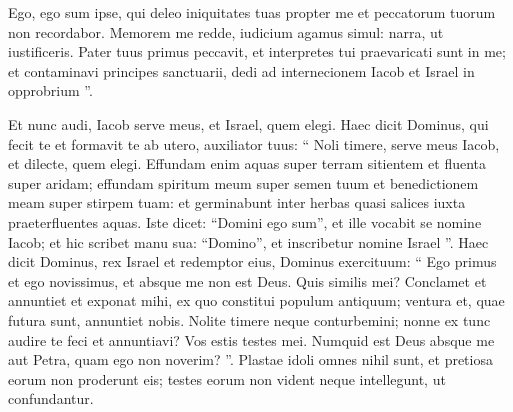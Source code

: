 \begin{biblechapter}
\begin{biblechapter}
\begin{biblechapter}
\begin{biblechapter}
\begin{biblechapter}
\begin{biblechapter}
\begin{biblechapter}
\begin{biblechapter}
\begin{biblechapter}
\begin{biblechapter}
\begin{biblechapter}
\begin{biblechapter}
\begin{biblechapter}
\begin{biblechapter}
\begin{biblechapter}
\begin{biblechapter}
\begin{biblechapter}
\begin{biblechapter}
\begin{biblechapter}
\begin{biblechapter}
\begin{biblechapter}
\begin{biblechapter}
\begin{biblechapter}
\begin{biblechapter}
\begin{biblechapter}
\begin{biblechapter}
\begin{biblechapter}
\begin{biblechapter}
\begin{biblechapter}
\begin{biblechapter}
\begin{biblechapter}
\begin{biblechapter}
\begin{biblechapter}
\begin{biblechapter}
\begin{biblechapter}
\begin{biblechapter}
\begin{biblechapter}
\begin{biblechapter}
\begin{biblechapter}
\begin{biblechapter}
\begin{biblechapter}
\begin{biblechapter}
\begin{biblechapter}
 \verse Ego, ego sum ipse, qui deleo iniquitates tuas propter me
 et peccatorum tuorum non recordabor.
 \verse Memorem me redde, iudicium agamus simul:
 narra, ut iustificeris.
 \verse Pater tuus primus peccavit,
 et interpretes tui praevaricati sunt in me;
 \verse et contaminavi principes sanctuarii,
 dedi ad internecionem Iacob
 et Israel in opprobrium ”.
 
\begin{biblechapter}
\verse Et nunc audi, Iacob serve meus,
 et Israel, quem elegi.
 \verse Haec dicit Dominus, qui fecit te
 et formavit te ab utero,
 auxiliator tuus:
 “ Noli timere, serve meus Iacob,
 et dilecte, quem elegi.
 \verse Effundam enim aquas super terram sitientem
 et fluenta super aridam;
 effundam spiritum meum super semen tuum
 et benedictionem meam super stirpem tuam:
 \verse et germinabunt inter herbas
 quasi salices iuxta praeterfluentes aquas.
 \verse Iste dicet: “Domini ego sum”,
 et ille vocabit se nomine Iacob;
 et hic scribet manu sua: “Domino”, et inscribetur nomine Israel ”.
 \verse Haec dicit Dominus, rex Israel
 et redemptor eius, Dominus exercituum:
 “ Ego primus et ego novissimus,
 et absque me non est Deus.
 \verse Quis similis mei? Conclamet et annuntiet
 et exponat mihi,
 ex quo constitui populum antiquum;
 ventura et, quae futura sunt, annuntiet nobis.
 \verse Nolite timere neque conturbemini;
 nonne ex tunc audire te feci et annuntiavi?
 Vos estis testes mei.
 Numquid est Deus absque me
 aut Petra, quam ego non noverim? ”.
 \verse Plastae idoli omnes nihil sunt, et pretiosa eorum non proderunt eis; testes eorum non vident neque intellegunt, ut confundantur. 

\end{biblechapter}
\end{biblechapter}
\end{biblechapter}
\end{biblechapter}
\end{biblechapter}
\end{biblechapter}
\end{biblechapter}
\end{biblechapter}
\end{biblechapter}
\end{biblechapter}
\end{biblechapter}
\end{biblechapter}
\end{biblechapter}
\end{biblechapter}
\end{biblechapter}
\end{biblechapter}
\end{biblechapter}
\end{biblechapter}
\end{biblechapter}
\end{biblechapter}
\end{biblechapter}
\end{biblechapter}
\end{biblechapter}
\end{biblechapter}
\end{biblechapter}
\end{biblechapter}
\end{biblechapter}
\end{biblechapter}
\end{biblechapter}
\end{biblechapter}
\end{biblechapter}
\end{biblechapter}
\end{biblechapter}
\end{biblechapter}
\end{biblechapter}
\end{biblechapter}
\end{biblechapter}
\end{biblechapter}
\end{biblechapter}
\end{biblechapter}
\end{biblechapter}
\end{biblechapter}
\end{biblechapter}
\end{biblechapter}
